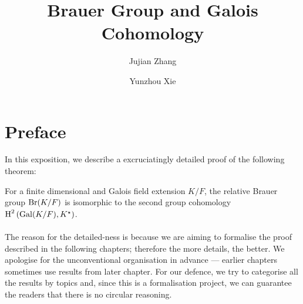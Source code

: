 \documentclass[a4paper]{report}
\title{Brauer Group and Galois Cohomology}
\author{Jujian Zhang \and Yunzhou Xie}
\begin{document}
\maketitle
\tableofcontents


\section*{Preface}
In this exposition, we describe a excruciatingly detailed proof of the following theorem:
\begin{theorem*}
  For a finite dimensional and Galois field extension $K/F$, the relative Brauer group $\operatorname{Br}(K/F)$ is isomorphic to the second group cohomology $\operatorname{H}^{2}\left(\operatorname{Gal}(K/F),K^{\star}\right)$.
\end{theorem*}

\paragraph{} The reason for the detailed-ness is because we are aiming to formalise the proof described in the following chapters; therefore the more details, the better. We apologise for the unconventional organisation in advance --- earlier chapters sometimes use results from later chapter. For our defence, we try to categorise all the results by topics and, since this is a formalisation project, we can guarantee the readers that there is no circular reasoning.


\end{document}
